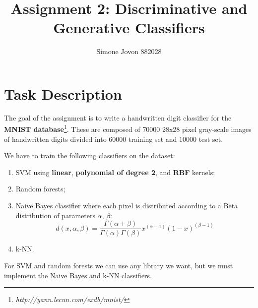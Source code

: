 \documentclass[12pt]{article}
\author{Simone Jovon 882028}
\title{Assignment 2: Discriminative and Generative Classifiers}
\begin{document}
\maketitle

\section{Task Description}

The goal of the assignment is to write a handwritten digit classifier for the 
\textbf{MNIST database}\footnote{\textit{http://yann.lecun.com/exdb/mnist/}}. 
These are composed of 70000 28x28 pixel gray-scale images 
of handwritten digits divided into 60000 training set and 10000 test set.

We have to train the following classifiers on the dataset:
\begin{enumerate}
    \item SVM  using \textbf{linear}, \textbf{polynomial of degree 2}, 
            and \textbf{RBF} kernels;
    \item Random forests;
    \item Naive Bayes classifier where each pixel is distributed according to a Beta 
          distribution of parameters $\alpha$, $\beta$:
          $$
          d(x,\alpha,\beta)=\frac{\Gamma(\alpha+\beta)}{\Gamma(\alpha)\Gamma(\beta)} x^{(\alpha-1)} (1-x)^{(\beta-1)}
          $$
    \item k-NN.
\end{enumerate}

For SVM and random forests we can use any library we want, but we must implement 
the Naive Bayes and k-NN classifiers.
\end{document}
